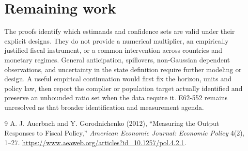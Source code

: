 \documentclass[11pt]{article}
\theoremstyle{definition}
\begin{document}
\section*{Remaining work}
The proofs identify which estimands and confidence sets are valid under their explicit designs. They do not provide a numerical multiplier, an empirically justified fiscal instrument, or a common intervention across countries and monetary regimes. General anticipation, spillovers, non-Gaussian dependent observations, and uncertainty in the state definition require further modeling or design. A useful empirical continuation would first fix the horizon, units and policy law, then report the complier or population target actually identified and preserve an unbounded ratio set when the data require it. E62-552 remains unresolved as that broader identification and measurement agenda.

\begin{thebibliography}{9}
 A. J. Auerbach and Y. Gorodnichenko (2012), ``Measuring the Output Responses to Fiscal Policy,'' \emph{American Economic Journal: Economic Policy} 4(2), 1--27. \url{https://www.aeaweb.org/articles?id=10.1257/pol.4.2.1}.
\end{thebibliography}
\end{document}
